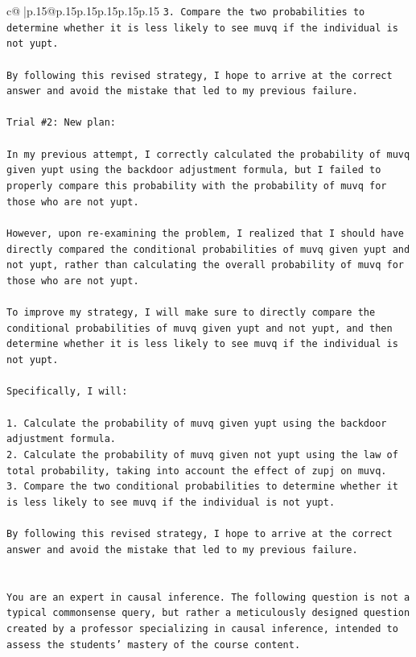 \documentclass{article}
\begin{document}
{\begin{supertabular}{c@{$\;$}|p{.15\linewidth}@{}p{.15\linewidth}p{.15\linewidth}p{.15\linewidth}p{.15\linewidth}p{.15\linewidth}}
{{{\texttt{3. Compare the two probabilities to determine whether it is less likely to see muvq if the individual is not yupt.} \\
\\ 
\texttt{By following this revised strategy, I hope to arrive at the correct answer and avoid the mistake that led to my previous failure.} \\
\\ 
\texttt{Trial \#2: New plan: } \\
\\ 
\texttt{In my previous attempt, I correctly calculated the probability of muvq given yupt using the backdoor adjustment formula, but I failed to properly compare this probability with the probability of muvq for those who are not yupt. } \\
\\ 
\texttt{However, upon re{-}examining the problem, I realized that I should have directly compared the conditional probabilities of muvq given yupt and not yupt, rather than calculating the overall probability of muvq for those who are not yupt. } \\
\\ 
\texttt{To improve my strategy, I will make sure to directly compare the conditional probabilities of muvq given yupt and not yupt, and then determine whether it is less likely to see muvq if the individual is not yupt. } \\
\\ 
\texttt{Specifically, I will:} \\
\\ 
\texttt{1. Calculate the probability of muvq given yupt using the backdoor adjustment formula.} \\
\texttt{2. Calculate the probability of muvq given not yupt using the law of total probability, taking into account the effect of zupj on muvq.} \\
\texttt{3. Compare the two conditional probabilities to determine whether it is less likely to see muvq if the individual is not yupt.} \\
\\ 
\texttt{By following this revised strategy, I hope to arrive at the correct answer and avoid the mistake that led to my previous failure.} \\
\\ 
\\ 
\texttt{You are an expert in causal inference. The following question is not a typical commonsense query, but rather a meticulously designed question created by a professor specializing in causal inference, intended to assess the students' mastery of the course content.} \\
}}}
\end{supertabular}}
\end{document}

